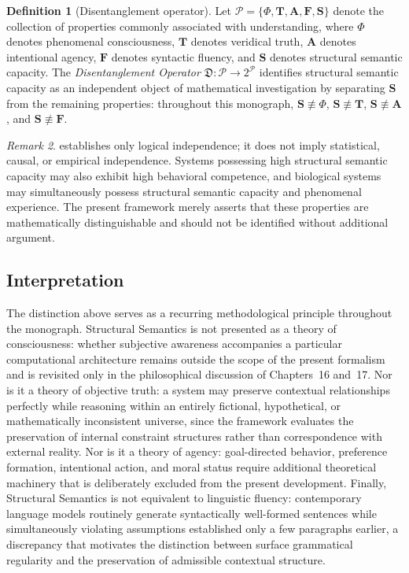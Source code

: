 \documentclass[11pt,twoside,openright]{book}
\numberwithin{equation}{chapter}
\theoremstyle{definition}
\newtheorem{definition}{Definition}[chapter]
\theoremstyle{plain}
\theoremstyle{remark}
\newtheorem{remark}[definition]{Remark}
\theoremstyle{definition}
\begin{document}
\begin{definition}[Disentanglement operator]
\label{def:disentanglement}
Let $\mathcal{P}=\{\Phi,\mathbf{T},\mathbf{A},\mathbf{F},\mathbf{S}\}$
denote the collection of properties commonly associated with
understanding, where $\Phi$ denotes phenomenal consciousness, $\mathbf{T}$
denotes veridical truth, $\mathbf{A}$ denotes intentional agency,
$\mathbf{F}$ denotes syntactic fluency, and $\mathbf{S}$ denotes
structural semantic capacity. The \emph{Disentanglement Operator}
$\mathfrak{D}:\mathcal{P}\to 2^{\mathcal{P}}$ identifies structural
semantic capacity as an independent object of mathematical investigation
by separating $\mathbf{S}$ from the remaining properties: throughout this
monograph, $\mathbf{S}\not\equiv\Phi$, $\mathbf{S}\not\equiv\mathbf{T}$,
$\mathbf{S}\not\equiv\mathbf{A}$, and $\mathbf{S}\not\equiv\mathbf{F}$.
\end{definition}

\begin{remark}
 establishes only logical independence; it does
not imply statistical, causal, or empirical independence. Systems
possessing high structural semantic capacity may also exhibit high
behavioral competence, and biological systems may simultaneously possess
structural semantic capacity and phenomenal experience. The present
framework merely asserts that these properties are mathematically
distinguishable and should not be identified without additional argument.
\end{remark}

\subsection{Interpretation}

The distinction above serves as a recurring methodological principle
throughout the monograph. Structural Semantics is not presented as a
theory of consciousness: whether subjective awareness accompanies a
particular computational architecture remains outside the scope of the
present formalism and is revisited only in the philosophical discussion
of Chapters~16 and~17. Nor is it a theory of objective truth: a system may
preserve contextual relationships perfectly while reasoning within an
entirely fictional, hypothetical, or mathematically inconsistent universe,
since the framework evaluates the preservation of internal constraint
structures rather than correspondence with external reality. Nor is it a
theory of agency: goal-directed behavior, preference formation, intentional
action, and moral status require additional theoretical machinery that is
deliberately excluded from the present development. Finally, Structural
Semantics is not equivalent to linguistic fluency: contemporary language
models routinely generate syntactically well-formed sentences while
simultaneously violating assumptions established only a few paragraphs
earlier, a discrepancy that motivates the distinction between surface
grammatical regularity and the preservation of admissible contextual
structure.
\end{document}
